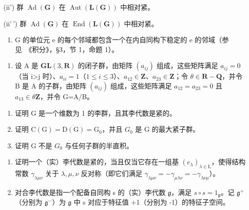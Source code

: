 (ii') 群 \(\operatorname{Ad}(\mathbf{G})\) 在 \(\operatorname{Aut}(\mathbf{L}(\mathbf{G}))\) 中相对紧。

(ii'\,') 群 \(\operatorname{Ad}(\mathbf{G})\) 在 \(\operatorname{End}(\mathbf{L}(\mathbf{G}))\) 中相对紧。

\begin{enumerate}
\def\labelenumi{(\alph{enumi})}
\setcounter{enumi}{21}
\tightlist
\item
  G 的单位元 e 的每个邻域都包含一个在内自同构下稳定的 e 的邻域（参见~《积分》，§3，节 1，命题 1）。
\end{enumerate}

\begin{enumerate}
\def\labelenumi{\arabic{enumi})}
\setcounter{enumi}{4}
\tightlist
\item
  设 A 是 \(\mathbf{GL}(3,\mathbf{R})\) 的闭子群，由矩阵 \((a_{ij})\) 组成，这些矩阵满足 \(a_{ij}=0\)（当 i\textgreater j 时）、\(a_{ii}=1\)（\(1\leq i\leq3\)）、\(a_{12}\in \mathbf{Z}\)、\(a_{23}\in \mathbf{Z}\)；令 \(\theta\in \mathbf{R}-\mathbf{Q}\)，并令 B 是 A 的子群，由矩阵 \((a_{ij})\) 组成，这些矩阵满足 \(a_{12}=a_{23}=0\) 且 \(a_{13}\in\theta\mathbf{Z}\)，并令 G=A/B。
\end{enumerate}

\begin{enumerate}
\def\labelenumi{\alph{enumi})}
\item
  证明 G 是一个维数为 1 的李群，且其李代数是紧的。
\item
  证明 \(\mathrm{C}(\mathrm{G}) = \overline{\mathrm{D}(\mathrm{G})} = \mathrm{G}_{0}\)，并且 \(G_{0}\) 是 G 的最大紧子群。
\item
  证明 G 不是 \(G_{0}\) 与任何子群的半直积。
\end{enumerate}

\begin{enumerate}
\def\labelenumi{\arabic{enumi})}
\setcounter{enumi}{5}
\item
  证明一个（实）李代数是紧的，当且仅当它存在一组基 \((e_{\lambda})_{\lambda\in\mathrm{L}}\)，使得结构常数 \(\gamma_{\lambda\mu\nu}\) 关于 \(\lambda,\mu,\nu\) 反对称（即它们满足 \(\gamma_{\lambda\mu\nu}=-\gamma_{\mu\lambda\nu}=-\gamma_{\lambda\nu\mu}\)）。
\item
  对合李代数是指一个配备自同构 s 的（实）李代数 \(\mathfrak{g}\)，满足 \(s \circ s = 1_{\mathfrak{g}}\)。记 \(\mathfrak{g}^{+}\)（分别为 \(\mathfrak{g}^{-}\)）为 \(\mathfrak{g}\) 中 s 对应于特征值 +1（分别为 -1）的特征子空间。
\end{enumerate}

